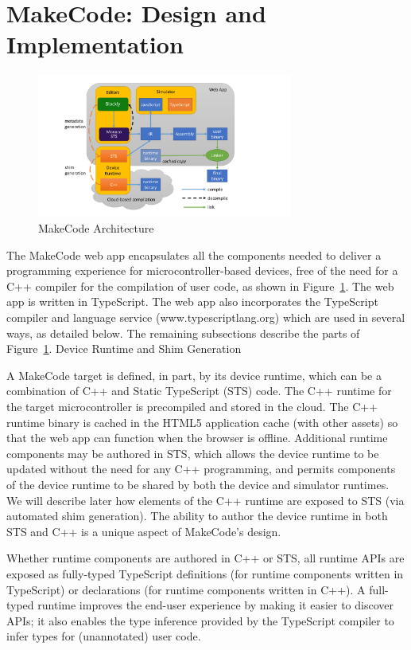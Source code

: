 \section{MakeCode: Design and Implementation}
\label{sec:makecode}

\begin{figure}[t]
    \includegraphics[width=3.3in]{diagrams.pdf}
\caption{\label{fig:makecode}MakeCode Architecture}
\end{figure}

The MakeCode web app encapsulates all the components needed to deliver a programming experience 
for microcontroller-based devices, free of the need for a C++ compiler for the compilation of user 
code, as shown in Figure~\ref{fig:makecode}. 
The web app is written in TypeScript. The web app also incorporates the TypeScript compiler and 
language service (www.typescriptlang.org) which are used in several ways, as detailed below. 
The remaining subsections describe the parts of Figure~\ref{fig:makecode}.
Device Runtime and Shim Generation

A MakeCode target is defined, in part, by its device runtime, which can be a combination of C++ 
and Static TypeScript (STS) code. The C++ runtime for the target microcontroller is precompiled 
and stored in the cloud. The C++ runtime binary is cached in the HTML5 application cache (with 
other assets) so that the web app can function when the browser is offline. Additional runtime
components may be authored in STS, which allows the device runtime to be updated without the need
for any C++ programming, and permits components of the device runtime to be shared by both the device
and simulator runtimes.  We will describe later how elements of the C++ runtime are exposed to STS
(via automated shim generation).  The ability to author the device runtime in both STS and C++ is
a unique aspect of MakeCode's design. 

Whether runtime components are authored in C++ or STS, all runtime APIs are exposed as fully-typed
TypeScript definitions (for runtime components written in TypeScript) or declarations (for runtime
components written in C++). A full-typed runtime improves the end-user experience by making it easier
to discover APIs; it also enables the type inference provided by the TypeScript compiler to infer types
for (unannotated) user code. 


